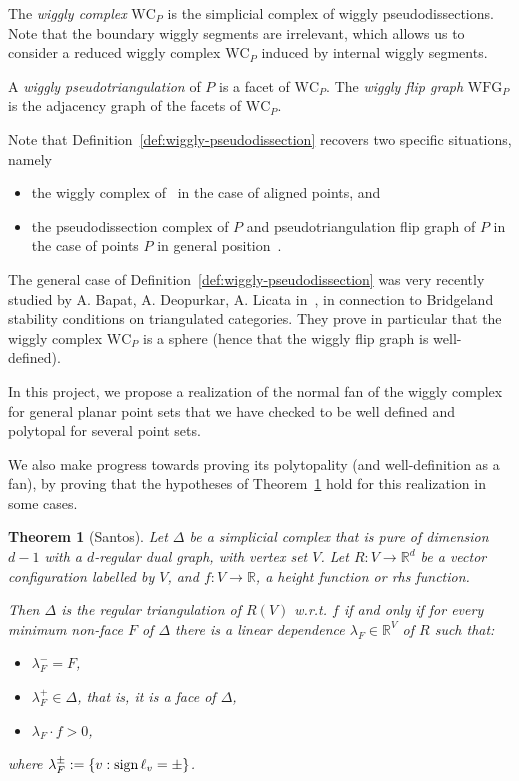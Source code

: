 \documentclass{amsart}
\newtheorem{theorem}{Theorem}
\theoremstyle{definition}
\newcommand{\R}{\mathbb{R}} %
\newcommand{\sign}{{\textnormal{sign}\,}} %
\newcommand{\reducedWigglyComplex}{\mathrm{WC}} %
\newcommand{\wigglyFlipGraph}{\mathrm{WFG}} %
\newcommand{\defn}[1]{\textsl{\color{darkblue} #1}} %
\begin{document}
The \defn{wiggly complex} $\reducedWigglyComplex_P$ is the simplicial complex of wiggly pseudodissections.
Note that the boundary wiggly segments are irrelevant, which allows us to consider a reduced wiggly
complex $\reducedWigglyComplex_P$ induced by internal wiggly segments.

A \defn{wiggly pseudotriangulation} of $P$ is a facet of $\reducedWigglyComplex_P$.
The \defn{wiggly flip graph} $\wigglyFlipGraph_P$ is the adjacency graph of the facets of $\reducedWigglyComplex_P$.

Note that Definition~\ref{def:wiggly-pseudodissection} recovers two specific situations, namely
\begin{itemize}
    \item the wiggly complex of~\cite{BapatPilaud25} in the case of aligned points, and
    \item the pseudodissection complex of $P$ and pseudotriangulation flip graph of $P$ in the case
    of points $P$ in general position~\cite{PocchiolaVegter96, RoteSantosStreinu08}.
\end{itemize}

The general case of Definition~\ref{def:wiggly-pseudodissection} was very recently studied by
A. Bapat, A. Deopurkar, A. Licata in~\cite{BapatDeopurkarLicata25}, in connection to Bridgeland
stability conditions on triangulated categories.
They prove in particular that the wiggly complex $\reducedWigglyComplex_P$ is a sphere
(hence that the wiggly flip graph is well-defined).

\vspace*{1em}%

In this project, we propose a realization of the normal fan of the
wiggly complex for general planar point sets that we have checked to be
well defined and polytopal for several point sets.

We also make progress towards proving its polytopality (and well-definition as a fan),
by proving that the hypotheses of Theorem~\ref{thm:simplicial-complex-is-regular-triangulation}
hold for this realization in some cases.

\begin{theorem}[Santos]
    \label{thm:simplicial-complex-is-regular-triangulation}
    Let $\Delta$ be a simplicial complex that is pure of dimension $d - 1$ with
    a $d$-regular dual graph, with vertex set $V$.
    Let $R: V \to \R^d$ be a vector configuration labelled by $V$,
    and $f: V \to \R$, a \emph{height function} or \emph{rhs function}.
    
    Then $\Delta$ is the regular triangulation of $R(V)$ w.r.t. $f$
    if and only if for every minimum non-face $F$ of $\Delta$ there is a linear
    dependence $\lambda_F\in \R^V$ of $R$ such that:
    \begin{itemize}
        \item $\lambda_F^{-} = F$,
        \item $\lambda_F^{+}\in \Delta$, that is, it is a face of $\Delta$,
        \item $\lambda_F \cdot f > 0$,
    \end{itemize}
    where $\lambda_F^{\pm} := \{v: \sign{\ell_v} = \pm\}$.
\end{theorem}
\end{document}
